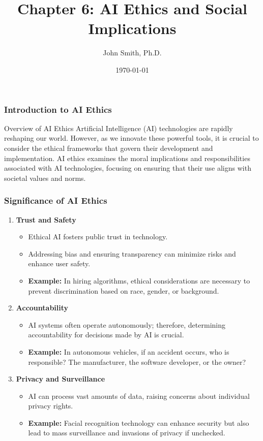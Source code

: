 \documentclass[aspectratio=169]{beamer}
\title[AI Ethics]{Chapter 6: AI Ethics and Social Implications}
\author[J. Smith]{John Smith, Ph.D.}
\institute[University Name]{
  Department of Computer Science\\
  University Name\\
  \vspace{0.3cm}
  Email: email@university.edu\\
  Website: www.university.edu
}
\date{\today}
\begin{document}
\frame{\titlepage}

\begin{frame}[fragile]
    \frametitle{Introduction to AI Ethics}
    \begin{block}{Overview of AI Ethics}
        Artificial Intelligence (AI) technologies are rapidly reshaping our world. However, as we innovate these powerful tools, it is crucial to consider the ethical frameworks that govern their development and implementation. AI ethics examines the moral implications and responsibilities associated with AI technologies, focusing on ensuring that their use aligns with societal values and norms.
    \end{block}
\end{frame}

\begin{frame}[fragile]
    \frametitle{Significance of AI Ethics}
    \begin{enumerate}
        \item \textbf{Trust and Safety}
            \begin{itemize}
                \item Ethical AI fosters public trust in technology.
                \item Addressing bias and ensuring transparency can minimize risks and enhance user safety.
                \item \textbf{Example:} In hiring algorithms, ethical considerations are necessary to prevent discrimination based on race, gender, or background.
            \end{itemize}
        
        \item \textbf{Accountability}
            \begin{itemize}
                \item AI systems often operate autonomously; therefore, determining accountability for decisions made by AI is crucial.
                \item \textbf{Example:} In autonomous vehicles, if an accident occurs, who is responsible? The manufacturer, the software developer, or the owner?
            \end{itemize}

        \item \textbf{Privacy and Surveillance}
            \begin{itemize}
                \item AI can process vast amounts of data, raising concerns about individual privacy rights.
                \item \textbf{Example:} Facial recognition technology can enhance security but also lead to mass surveillance and invasions of privacy if unchecked.
            \end{itemize}


\end{enumerate}
\end{frame}
\end{document}
